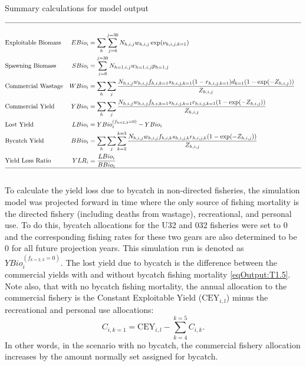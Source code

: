 \begin{table}
	\caption{Summary calculations for model output}
	\label{table:ModelOutputs}
	\begin{footnotesize}
		

	\begin{center}
	\tableEq
	\begin{align}
		\hline \nonumber\\
		&\mbox{Exploitable Biomass}
		&EBio_i &= \sum_h \sum_{j=6}^{j=30} N_{h,i,j} w_{h,i,j} \exp(\nu_{h,i,j,k=1})\label{eqOutput:T1.1} \\
		&\mbox{Spawning Biomass}
		&SBio_i &= \sum_{j=6}^{j=30} N_{h=1,i,j} w_{h=1,i,j} p_{h=1,j}\label{eqOutput:T1.2}\\
		&\mbox{Commercial Wastage}
		&WBio_i &= \sum_h \sum_j \frac{N_{h,i,j}w_{h,i,j}f_{h,i,k=1}s_{h,i,j,k=1}(1-r_{h,i,j,k=1})d_{k=1}(1-\exp(-Z_{h,i,j}))}
		{Z_{h,i,j}} \label{eqOutput:T1.3}\\
		&\mbox{Commercial Yield}
		&YBio_i &= \sum_h \sum_j \frac{N_{h,i,j}w_{h,i,j}f_{h,i,k=1}s_{h,i,j,k=1} r_{h,i,j,k=1}(1-\exp(-Z_{h,i,j}))}
		{Z_{h,i,j}}\label{eqOutput:T1.4}\\
		&\mbox{Lost Yield}
		&LBio_i &= YBio_i^{(f_{k=2,3}=0)} - YBio_i \label{eqOutput:T1.5}\\
		&\mbox{Bycatch Yield}
		&BBio_i &= \sum_h \sum_j \sum_{k=2}^{k=3}\frac{N_{h,i,j}w_{h,i,j}f_{h,i,k}s_{h,i,j,k} r_{h,i,j,k}(1-\exp(-Z_{h,i,j}))}
		{Z_{h,i,j}}\label{eqOutput:T1.6}\\
		&\mbox{Yield Loss Ratio}
		&YLR_i & = \frac{LBio_i}{BBio_i}\label{eqOutput:T1.7} \\
		\hline \nonumber
	\end{align}
	\normalEq
	\end{center}
		\end{footnotesize}
\end{table}

To calculate the yield loss due to bycatch in non-directed fisheries, the simulation model was projected forward in time where the only source of fishing mortality is the directed fishery (including deaths from wastage),  recreational, and personal use.  To do this,  bycatch allocations for the U32 and 032 fisheries were set to 0 and the corresponding fishing rates for these two gears are also determined to be 0 for all future projection years.  This simulation run is denoted as $YBio_i^{(f_{k=2,3}=0)}$.  The lost yield due to bycatch is the difference between the commercial yields with and without bycatch fishing mortality \eqref{eqOutput:T1.5}.  Note also, that with no bycatch fishing mortality, the annual allocation to the commercial fishery is the Constant Exploitable Yield ($\mathrm{CEY}_{i,l}$) minus the recreational and personal use allocations:
\[ C_{i,k=1} = \mathrm{CEY}_{i,l} - \sum_{k=4}^{k=5} C_{i,k}. \]
In other words, in the scenario with no bycatch, the commercial fishery allocation increases by the amount normally set assigned for bycatch.

